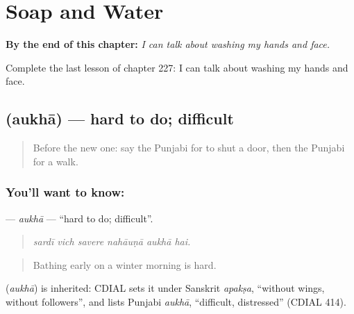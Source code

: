 
\chapter{Soap and Water}
\label{ch:pa-a2-soap-and-water}

\begin{chapteropening}
\textbf{By the end of this chapter:} \emph{I can talk about washing my hands and face.}

Complete the last lesson of chapter 227: I can talk about washing my hands and face.
\end{chapteropening}

\section[\texorpdfstring{\pa{ਔਖਾ} (aukhā)}{ਔਖਾ (aukhā)}]{ (aukhā) — hard to do; difficult}

\label{lesson:PA-C227-aukha}



\begin{quote}
Before the new one: say the Punjabi for to shut a door, then the Punjabi for a walk.
\end{quote}

\subsection*{You'll want to know: }
\textbf{} — \emph{aukhā} — \textquotedblleft{}hard to do; difficult\textquotedblright{}.

\begin{quote}
     
\end{quote}

\begin{quote}
\emph{sardī vich savere nahāuṇā aukhā hai.}
\end{quote}

\begin{quote}
Bathing early on a winter morning is hard.
\end{quote}

\begin{cousinweb}
\textbf{} (\emph{aukhā}) is inherited: CDIAL sets it under Sanskrit \emph{apakṣa}, \textquotedblleft{}without wings, without followers\textquotedblright{}, and lists Punjabi \emph{aukhā}, \textquotedblleft{}difficult, distressed\textquotedblright{} (CDIAL 414).
\end{cousinweb}

